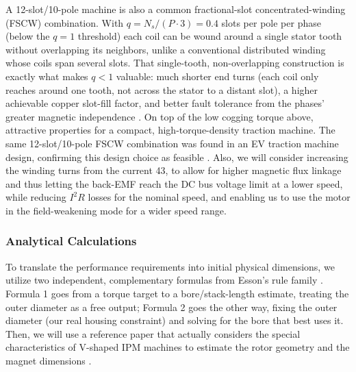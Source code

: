 \documentclass[10pt,final,journal,a4paper,oneside,twocolumn]{IEEEtran}
\begin{document}
A 12-slot/10-pole machine is also a common fractional-slot concentrated-winding (FSCW) combination. With $q=N_s/(P\cdot3)=0.4$ slots per pole per phase (below the $q=1$ threshold) each coil can be wound around a single stator tooth without overlapping its neighbors, unlike a conventional distributed winding whose coils span several slots. That single-tooth, non-overlapping construction is exactly what makes $q<1$ valuable: much shorter end turns (each coil only reaches around one tooth, not across the stator to a distant slot), a higher achievable copper slot-fill factor, and better fault tolerance from the phases' greater magnetic independence \cite{ElRefaie2010}. On top of the low cogging torque above, attractive properties for a compact, high-torque-density traction machine. The same 12-slot/10-pole FSCW combination was found in an EV traction machine design, confirming this design choice as feasible \cite{Metwly2021}.
Also, we will consider increasing the winding turns from the current 43, to allow for higher magnetic flux linkage and thus letting the back-EMF reach the DC bus voltage limit at a lower speed, while reducing $I^2R$ losses for the nominal speed, and enabling us to use the motor in the field-weakening mode for a wider speed range.

\subsubsection{Analytical Calculations}
To translate the performance requirements into initial physical dimensions, we utilize two independent, complementary formulas from Esson's rule family \cite{LucaLecture6}. Formula 1 goes from a torque target to a bore/stack-length estimate, treating the outer diameter as a free output; Formula 2 goes the other way, fixing the outer diameter (our real housing constraint) and solving for the bore that best uses it. Then, we will use a reference paper that actually considers the special characteristics of V-shaped IPM machines to estimate the rotor geometry and the magnet dimensions \cite{DiGerlandoRicca2022}.
\end{document}
